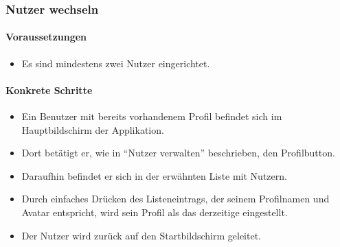 \subsubsection{Nutzer wechseln}
\paragraph{Voraussetzungen}
\begin{itemize}
\item Es sind mindestens zwei Nutzer eingerichtet.
\end{itemize}

\paragraph{Konkrete Schritte}
\begin{itemize}
\item Ein Benutzer mit bereits vorhandenem Profil befindet sich im Hauptbildschirm der Applikation.
\item Dort betätigt er, wie in "`Nutzer verwalten"' beschrieben, den Profilbutton.
\item Daraufhin befindet er sich in der erwähnten Liste mit Nutzern. 
\item Durch einfaches Drücken des Listeneintrags, der seinem Profilnamen und
Avatar entspricht, wird sein Profil als das derzeitige eingestellt.
\item Der Nutzer wird zurück auf den Startbildschirm geleitet.
\end{itemize}
